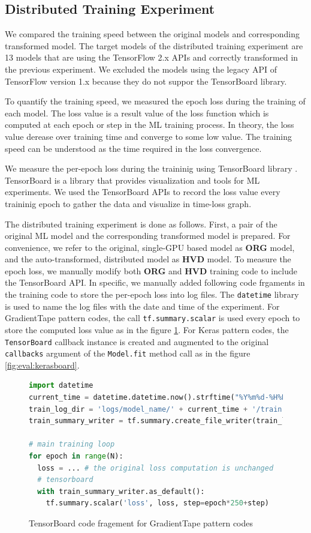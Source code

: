 \subsection{Distributed Training Experiment}

We compared the training speed between the original models and
corresponding transformed model. 
The target models of the distributed training experiment are 
13 models that are using the TensorFlow 2.x APIs and correctly
transformed in the previous experiment.
We excluded the models using the legacy API of
TensorFlow version 1.x because they do not suppor the TensorBoard library. 

To quantify the training speed, we measured the epoch loss during the training
of each model.
The loss value is a result value of the loss function which is computed
at each epoch or step in the ML training process.
In theory, the loss value derease over training time and converge
to some low value.
The training speed can be understood as the time required in the
loss convergence.

We measure the per-epoch loss during the traininig using
TensorBoard library \cite{tensorboard}. 
TensorBoard is a library that provides visualization and tools
for ML experiments.
We used the TensorBoard APIs to record the loss value every traininig epoch
to gather the data and visualize in time-loss graph.

The distributed training experiment is done as follows.
First, a pair of the original ML model and the corresponding transformed model
is prepared. For convenience, we refer to the original, single-GPU based model
as \textbf{ORG} model, and the auto-transformed, distributed model as
\textbf{HVD} model. To measure the epoch loss, we manually modify both  
\textbf{ORG} and \textbf{HVD} training code to include the TensorBoard API. 
In specific, we manually added following code frgaments in the training code to
store the per-epoch loss into log files.
The {\tt datetime} library is used to name the log files with
the date and time of the experiment.
For GradientTape pattern codes, the call
{\tt tf.summary.scalar} is used every epoch to store the
computed loss value as in the figure \ref{fig:eval:tapeboard}.
For Keras pattern codes, the {\tt TensorBoard} callback instance is
created and augmented to the original {\tt callbacks} argument
of the {\tt Model.fit} method call as in the figure \ref{fig:eval:kerasboard}.

\begin{figure}[!ht]
  \begin{lstlisting}[language=Python]
import datetime
current_time = datetime.datetime.now().strftime("%Y%m%d-%H%M%S")
train_log_dir = 'logs/model_name/' + current_time + '/train'
train_summary_writer = tf.summary.create_file_writer(train_log_dir)

# main training loop
for epoch in range(N): 
  loss = ... # the original loss computation is unchanged
  # tensorboard
  with train_summary_writer.as_default():
    tf.summary.scalar('loss', loss, step=epoch*250+step)
  \end{lstlisting}
  \caption{TensorBoard code fragement for GradientTape pattern codes}
  \label{fig:eval:tapeboard}
\end{figure}

